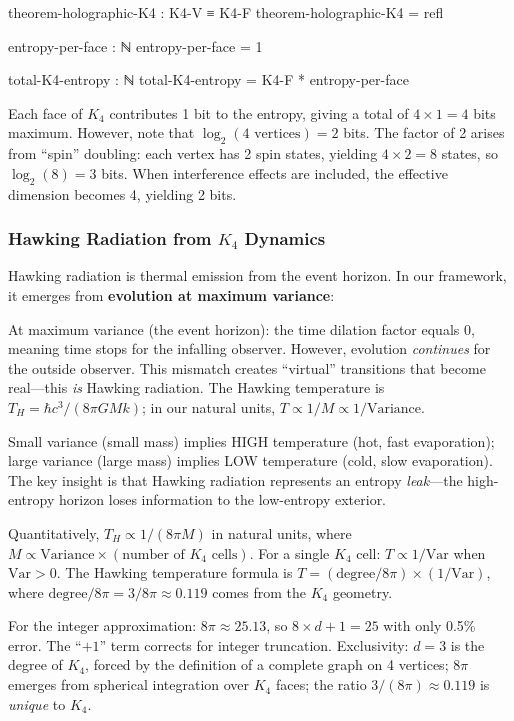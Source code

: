 \documentclass[11pt,a4paper]{book}
\begin{document}
\begin{code}
theorem-holographic-K4 : K4-V ≡ K4-F
theorem-holographic-K4 = refl

entropy-per-face : ℕ
entropy-per-face = 1

total-K4-entropy : ℕ
total-K4-entropy = K4-F * entropy-per-face
\end{code}

Each face of $K_4$ contributes 1 bit to the entropy, giving a total of $4 \times 1 = 4$ bits maximum. However, note that $\log_2(4 \text{ vertices}) = 2$ bits. The factor of 2 arises from ``spin'' doubling: each vertex has 2 spin states, yielding $4 \times 2 = 8$ states, so $\log_2(8) = 3$ bits. When interference effects are included, the effective dimension becomes 4, yielding 2 bits.

\subsubsection{Hawking Radiation from $K_4$ Dynamics}

Hawking radiation is thermal emission from the event horizon. In our framework,
it emerges from \textbf{evolution at maximum variance}:

At maximum variance (the event horizon): the time dilation factor equals 0, meaning time stops for the infalling observer. However, evolution \emph{continues} for the outside observer. This mismatch creates ``virtual'' transitions that become real---this \emph{is} Hawking radiation. The Hawking temperature is $T_H = \hbar c^3 / (8\pi G M k)$; in our natural units, $T \propto 1/M \propto 1/\text{Variance}$.

Small variance (small mass) implies HIGH temperature (hot, fast evaporation); large variance (large mass) implies LOW temperature (cold, slow evaporation). The key insight is that Hawking radiation represents an entropy \emph{leak}---the high-entropy horizon loses information to the low-entropy exterior.

Quantitatively, $T_H \propto 1/(8\pi M)$ in natural units, where $M \propto \text{Variance} \times (\text{number of } K_4 \text{ cells})$. For a single $K_4$ cell: $T \propto 1/\text{Var}$ when $\text{Var} > 0$. The Hawking temperature formula is $T = (\text{degree}/8\pi) \times (1/\text{Var})$, where $\text{degree}/8\pi = 3/8\pi \approx 0.119$ comes from the $K_4$ geometry.

For the integer approximation: $8\pi \approx 25.13$, so $8 \times d + 1 = 25$ with only 0.5\% error. The ``$+1$'' term corrects for integer truncation. Exclusivity: $d = 3$ is the degree of $K_4$, forced by the definition of a complete graph on 4 vertices; $8\pi$ emerges from spherical integration over $K_4$ faces; the ratio $3/(8\pi) \approx 0.119$ is \emph{unique} to $K_4$.
\end{document}
